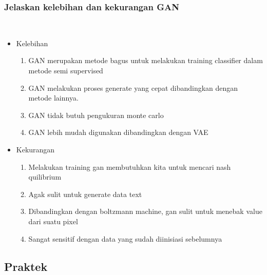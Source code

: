 \subsubsection{Jelaskan kelebihan dan kekurangan GAN} 
\hfill\\
\begin{itemize}
 \item Kelebihan 
   \begin{enumerate}
      \item GAN  merupakan metode bagus untuk melakukan training classifier dalam metode semi supervised
      \item GAN melakukan proses generate yang cepat dibandingkan dengan metode lainnya.
      \item GAN tidak butuh pengukuran monte carlo
      \item GAN lebih mudah digunakan dibandingkan dengan VAE
   \end{enumerate}
 \item Kekurangan
   \begin{enumerate}  
      \item Melakukan training gan membutuhkan kita untuk mencari nash quilibrium
      \item Agak sulit untuk generate data text
      \item Dibandingkan dengan boltzmann machine, gan sulit untuk menebak value dari suatu pixel
      \item Sangat sensitif dengan data yang sudah diinisiasi sebelumnya
   \end{enumerate}
\end{itemize}

\subsection{Praktek}
